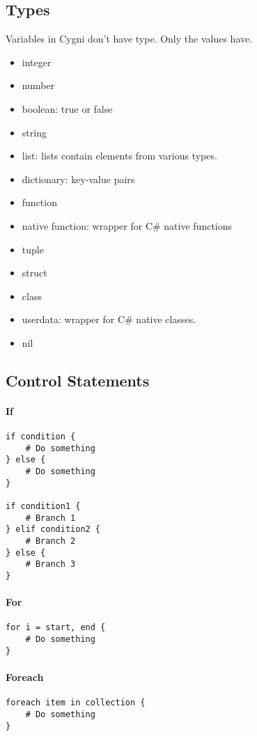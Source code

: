 \documentclass[]{article}
\begin{document}
\subsection{Types}
Variables in Cygni don't have type. Only the values have.
\begin{itemize}
	\item integer
	\item number
	\item boolean: true or false
	\item string
	\item list: lists contain elements from various types.
	\item dictionary: key-value pairs
	\item function
	\item native function: wrapper for C\# native functions
	\item tuple
	\item struct
	\item class
	\item userdata: wrapper for C\# native classes.
	\item nil
\end{itemize}

\subsection{Control Statements}
\paragraph{If}
\begin{lstlisting}
if condition {
	# Do something
} else {
	# Do something
}

if condition1 {
	# Branch 1
} elif condition2 {
	# Branch 2
} else {
	# Branch 3
}
\end{lstlisting}
\paragraph{For}

\begin{lstlisting}
for i = start, end {
	# Do something
}
\end{lstlisting}

\paragraph{Foreach}
\begin{lstlisting}
foreach item in collection {
	# Do something
}
\end{lstlisting}
\end{document}
